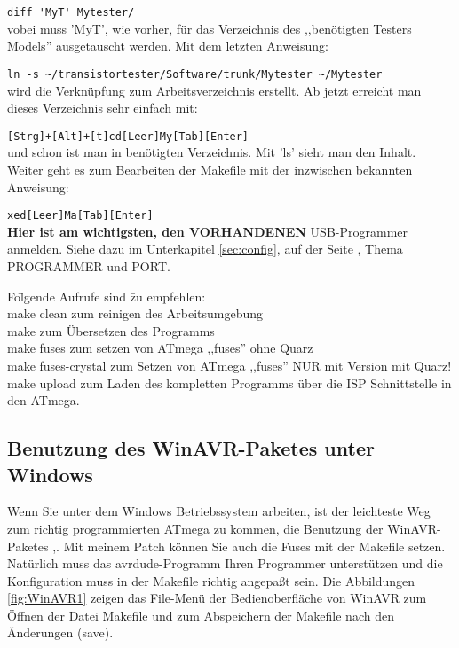 \verb"diff 'MyT' Mytester/"\\
vobei muss 'MyT', wie vorher, für das Verzeichnis des ,,benötigten Testers Models'' ausgetauscht werden.
Mit dem letzten Anweisung:

\verb"ln -s ~/transistortester/Software/trunk/Mytester ~/Mytester"\\
wird die Verknüpfung zum Arbeitsverzeichnis erstellt. 
Ab jetzt erreicht man dieses Verzeichnis sehr einfach mit:

\verb"[Strg]+[Alt]+[t]cd[Leer]My[Tab][Enter]"\\
und schon ist man in benötigten Verzeichnis. Mit 'ls' sieht man den Inhalt.\\
Weiter geht es zum Bearbeiten der Makefile mit der inzwischen bekannten Anweisung:

\verb"xed[Leer]Ma[Tab][Enter]"\\
\textbf {Hier ist am wichtigsten, den VORHANDENEN} USB-Programmer anmelden.
Siehe dazu im Unterkapitel \ref{sec:config}, auf der Seite \pageref{sec:config-Prog},
Thema PROGRAMMER und PORT.

\begin{tabbing}
Fo\=lgende Aufrufe sind \=zu empfehlen:\\
\> make clean \> zum reinigen des Arbeitsumgebung\\
\> make       \> zum Übersetzen des Programms\\
\> make fuses \> zum setzen von ATmega ,,fuses'' ohne Quarz\\
\> make fuses-crystal \> zum Setzen von ATmega ,,fuses'' NUR mit Version mit Quarz!\\
\> make upload \> zum Laden des kompletten Programms über die ISP Schnittstelle in den ATmega.
\end{tabbing}

\newpage
\subsection{Benutzung des WinAVR-Paketes unter Windows}

Wenn Sie unter dem Windows Betriebssystem arbeiten, ist der leichteste Weg zum
richtig programmierten ATmega zu kommen, die Benutzung der WinAVR-Paketes \cite{winavr1},\cite{winavr2}.
Mit meinem Patch \cite{winavr3} können Sie auch die Fuses mit der Makefile setzen.
Natürlich muss das avrdude-Programm Ihren Programmer unterstützen und die Konfiguration muss in
der Makefile richtig angepaßt sein.
Die Abbildungen \ref{fig:WinAVR1} zeigen das File-Menü der Bedienoberfläche von WinAVR zum
Öffnen der Datei Makefile und zum Abspeichern der Makefile nach den Änderungen (save).

